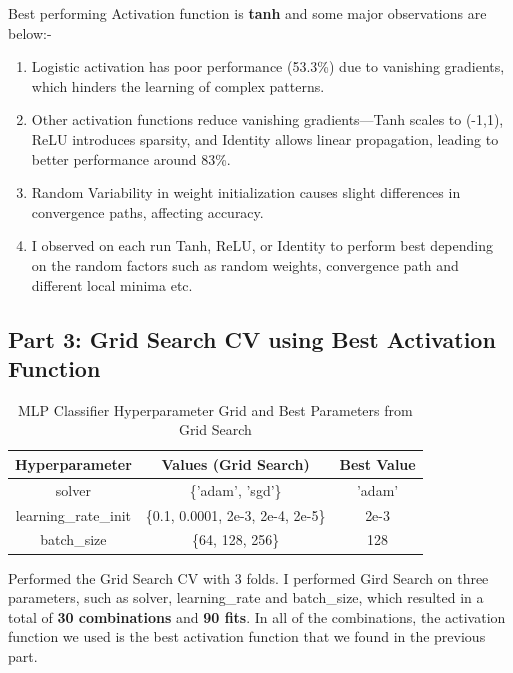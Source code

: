 \documentclass{article}
\begin{document}
\hspace{0pt}Best performing Activation function is \textbf{tanh} and some major observations are below:-

\begin{enumerate}
\item Logistic activation has poor performance (53.3\%) due to vanishing gradients, which hinders the learning of complex patterns.
\item Other activation functions reduce vanishing gradients—Tanh scales to (-1,1), ReLU introduces sparsity, and Identity allows linear propagation, leading to better performance around 83\%.
\item Random Variability in weight initialization causes slight differences in convergence paths, affecting accuracy.
\item I observed on each run Tanh, ReLU, or Identity to perform best depending on the random factors such as random weights, convergence path and different local minima etc.
\end{enumerate}

\subsection*{Part 3: Grid Search CV using Best Activation Function}
\begin{table}[H]
    \centering
    \begin{tabular}{|c|c|c|} %
        \hline
        \textbf{Hyperparameter} & \textbf{Values (Grid Search)} & \textbf{Best Value} \\
        \hline
        solver & \{'adam', 'sgd'\} & 'adam'\\ \hline
        learning\_rate\_init & \{0.1, 0.0001, 2e-3, 2e-4, 2e-5\} & 2e-3 \\ \hline
        batch\_size & \{64, 128, 256\} & 128 \\ \hline
    \end{tabular}
    \caption{MLP Classifier Hyperparameter Grid and Best Parameters from Grid Search}
\end{table}

\hspace{-3pt}
Performed the Grid Search CV with 3 folds. I performed Gird Search on three parameters, such as solver, learning\_rate and batch\_size, which resulted in a total of \textbf{30 combinations} and \textbf{90 fits}. In all of the combinations, the activation function we used is the best activation function that we found in the previous part.
\end{document}
